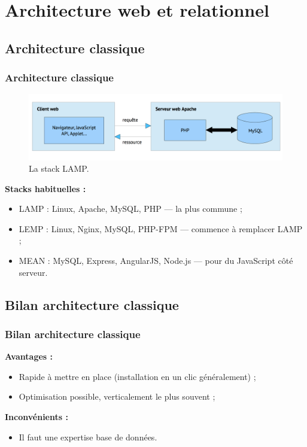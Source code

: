 \section{Architecture web et relationnel}
	\subsection{Architecture classique}
	\begin{frame}
		\frametitle{Architecture classique}

		\begin{figure}[htb]
			\includegraphics[width=1\textwidth]{images/LAMP.png}
			\caption{La stack LAMP.}
		\end{figure}

		\textbf{Stacks habituelles :}
		\begin{itemize}
			\item LAMP : Linux, Apache, MySQL, PHP — la plus commune ;
			\item LEMP : Linux, Nginx, MySQL, PHP-FPM — commence à remplacer LAMP ;
			\item MEAN : MySQL, Express, AngularJS, Node.js — pour du JavaScript côté serveur.
		\end{itemize}

	\end{frame}

	\subsection{Bilan architecture classique}
	\begin{frame}
		\frametitle{Bilan architecture classique}

		\textbf{Avantages :}
		\begin{itemize}
			\item Rapide à mettre en place (installation en un clic généralement) ;
			\item Optimisation possible, verticalement le plus souvent ;
		\end{itemize}

		\vspace{20px}

		\textbf{Inconvénients :}
		\begin{itemize}
			\item Il faut une expertise base de données.
		\end{itemize}

	\end{frame}

